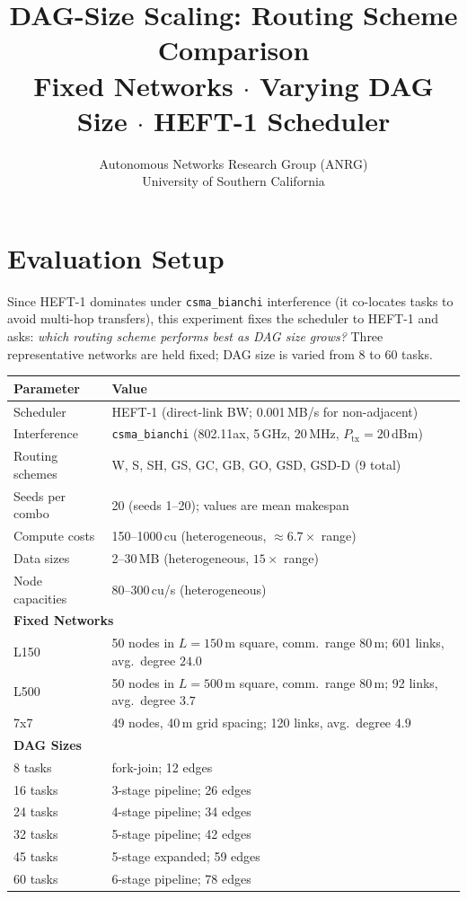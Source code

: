 \documentclass[11pt]{article}
\title{DAG-Size Scaling: Routing Scheme Comparison\\
{\large Fixed Networks $\cdot$ Varying DAG Size $\cdot$ HEFT-1 Scheduler}}
\author{Autonomous Networks Research Group (ANRG)\\University of Southern California}
\date{}
\begin{document}
\maketitle
\tableofcontents
\newpage


\section{Evaluation Setup}

Since HEFT-1 dominates under \texttt{csma\_bianchi} interference (it co-locates
tasks to avoid multi-hop transfers), this experiment fixes the scheduler to HEFT-1
and asks: \emph{which routing scheme performs best as DAG size grows?}
Three representative networks are held fixed; DAG size is varied from 8 to 60 tasks.

\begin{center}
\small
\begin{tabularx}{\textwidth}{l X}
\toprule
\textbf{Parameter} & \textbf{Value} \\
\midrule

Scheduler & HEFT-1 (direct-link BW; 0.001\,MB/s for non-adjacent) \\
Interference & \texttt{csma\_bianchi} (802.11ax, 5\,GHz, 20\,MHz, $P_\text{tx}=20$\,dBm) \\
Routing schemes & W, S, SH, GS, GC, GB, GO, GSD, GSD-D (9 total) \\
Seeds per combo & 20 (seeds 1--20); values are mean makespan \\
Compute costs & 150--1000\,cu (heterogeneous, $\approx6.7\times$ range) \\
Data sizes & 2--30\,MB (heterogeneous, $15\times$ range) \\
Node capacities & 80--300\,cu/s (heterogeneous) \\
\midrule
\multicolumn{2}{l}{\textbf{Fixed Networks}} \\
  L150 & 50 nodes in $L=150$\,m square, comm.\ range 80\,m; 601 links, avg.\ degree $24.0$ \\
  L500 & 50 nodes in $L=500$\,m square, comm.\ range 80\,m; 92 links, avg.\ degree $3.7$ \\
  7x7 & 49 nodes, 40\,m grid spacing; 120 links, avg.\ degree $4.9$ \\
\midrule
\multicolumn{2}{l}{\textbf{DAG Sizes}} \\
  8 tasks & fork-join; 12 edges \\
  16 tasks & 3-stage pipeline; 26 edges \\
  24 tasks & 4-stage pipeline; 34 edges \\
  32 tasks & 5-stage pipeline; 42 edges \\
  45 tasks & 5-stage expanded; 59 edges \\
  60 tasks & 6-stage pipeline; 78 edges \\
\bottomrule
\end{tabularx}
\par\smallskip{}
\end{center}
\addtocounter{table}{1}
\end{document}
